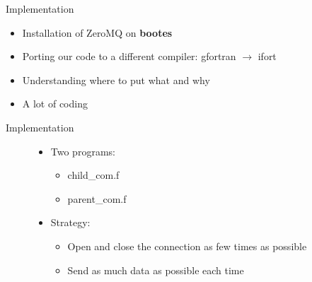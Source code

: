 \documentclass{beamer}
\begin{document}
    \begin{frame}{Implementation}
    \begin{itemize}[<+-|alert@+>]
        \item Installation of ZeroMQ on \bf{bootes}
        \item Porting our code to a different compiler: gfortran $\rightarrow$ ifort
        \item Understanding where to put what and why
        \item A lot of coding
    \end{itemize}
    \end{frame}
    \begin{frame}{Implementation}
        \begin{figure}[h!]
        \centering
        \begin{minipage}{.5\columnwidth}
            \begin{itemize}[<+-|alert@+>]
                \item Two programs:
                \begin{itemize}[<+-|alert@+>]
                    \item child\_com.f
                    \item parent\_com.f
                \end{itemize}
                \item Strategy:
                \begin{itemize}[<+-|alert@+>]
                    \item Open and close the connection as few times as
                          possible
                    \item Send as much data as possible each time
                \end{itemize}
            \end{itemize}
        \end{minipage}%
        \begin{minipage}{.5\columnwidth}
            \centering

\end{minipage}
\end{figure}
\end{frame}
\end{document}
